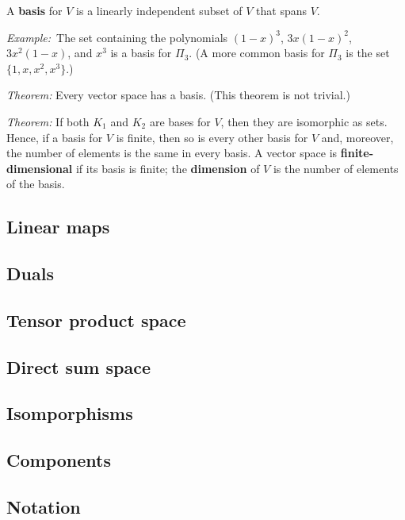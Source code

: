 \documentclass[10pt, a4paper, twocolumn]{article}
\newcommand{\defn}[1]{\textbf{#1}}
\newcommand{\eg}{\emph{Example:}\relax}
\begin{document}
A \defn{basis} for $V$ is a linearly independent subset of $V$ that spans $V$. 

\eg\ The set containing the polynomials $(1-x)^3$, $3x(1-x)^2$, $3x^2(1-x)$, and $x^3$ is a
basis for $\Pi_3$. (A more common basis for $\Pi_3$ is the set $\{1, x, x^2, x^3\}$.) 

\emph{Theorem:} Every vector space has a basis. (This theorem is not trivial.)

\emph{Theorem:} If both $K_1$ and $K_2$ are bases for $V$, then they are isomorphic as sets. Hence, if
a basis for $V$ is finite, then so is every other basis for $V$ and, moreover, the number of elements
is the same in every basis. A vector space is \defn{finite-dimensional} if its basis is finite; the
\defn{dimension} of $V$ is the number of elements of the basis.   

\subsection{Linear maps}
\subsection{Duals}
\subsection{Tensor product space}
\subsection{Direct sum space}
\subsection{Isomporphisms}
\subsection{Components}
\subsection{Notation} 
\end{document}
